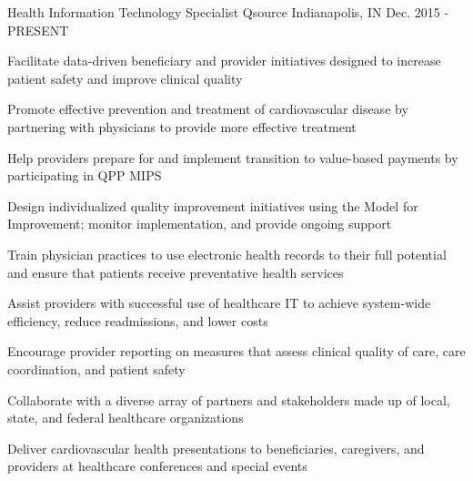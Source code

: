 

\begin{cventries}


  \cventry
    {Health Information Technology Specialist} %
    {Qsource} %
    {Indianapolis, IN} %
    {Dec. 2015 - PRESENT} %
    {
      \begin{cvitems} %
      \item {Facilitate data-driven beneficiary and provider initiatives designed to increase patient safety and improve clinical quality}
      \item {Promote effective prevention and treatment of cardiovascular disease by partnering with physicians to provide more effective treatment}
        \item {Help providers prepare for and implement transition to value-based payments by participating in QPP MIPS}
    \item {Design individualized quality improvement initiatives using the Model for Improvement; monitor implementation, and provide ongoing support}
    \item {Train physician practices to use electronic health records to their full potential and ensure that patients receive preventative health services}
    \item {Assist providers with successful use of healthcare IT to achieve system-wide efficiency, reduce readmissions, and lower costs}
    \item {Encourage provider reporting on measures that assess clinical quality of care, care coordination, and patient safety}
    \item {Collaborate with a diverse array of partners and stakeholders made up of local, state, and federal healthcare organizations}
    \item {Deliver cardiovascular health presentations to beneficiaries, caregivers, and providers at healthcare conferences and special events}
  \end{cvitems}
    }


\end{cventries}

